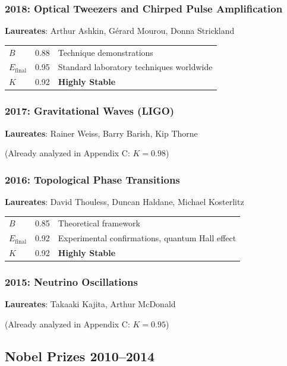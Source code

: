 \documentclass[11pt,a4paper]{article}
\begin{document}
\subsubsection{2018: Optical Tweezers and Chirped Pulse Amplification}
\textbf{Laureates}: Arthur Ashkin, Gérard Mourou, Donna Strickland

\begin{center}
\begin{tabular}{lcl}
\toprule
$B$ & 0.88 & Technique demonstrations \\
$E_{\text{final}}$ & 0.95 & Standard laboratory techniques worldwide \\
$K$ & 0.92 & \textbf{Highly Stable} \\
\bottomrule
\end{tabular}
\end{center}

\subsubsection{2017: Gravitational Waves (LIGO)}
\textbf{Laureates}: Rainer Weiss, Barry Barish, Kip Thorne

(Already analyzed in Appendix C: $K = 0.98$)

\subsubsection{2016: Topological Phase Transitions}
\textbf{Laureates}: David Thouless, Duncan Haldane, Michael Kosterlitz

\begin{center}
\begin{tabular}{lcl}
\toprule
$B$ & 0.85 & Theoretical framework \\
$E_{\text{final}}$ & 0.92 & Experimental confirmations, quantum Hall effect \\
$K$ & 0.92 & \textbf{Highly Stable} \\
\bottomrule
\end{tabular}
\end{center}

\subsubsection{2015: Neutrino Oscillations}
\textbf{Laureates}: Takaaki Kajita, Arthur McDonald

(Already analyzed in Appendix C: $K = 0.95$)

\subsection{Nobel Prizes 2010--2014}
\end{document}
